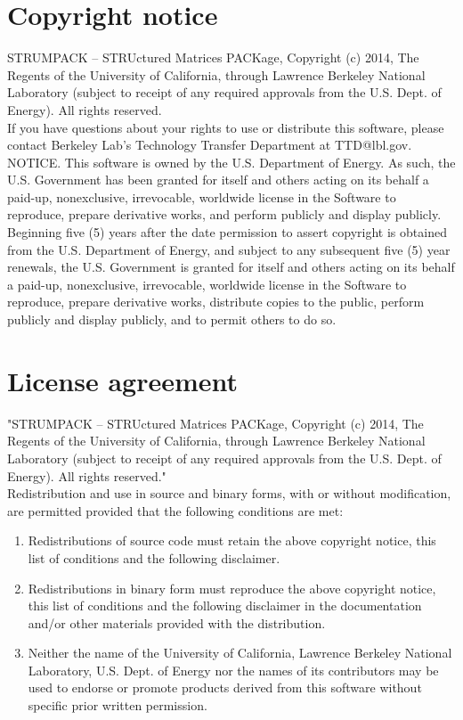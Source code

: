 \documentclass{article}
\begin{document}
\section{Copyright notice}
STRUMPACK -- STRUctured Matrices PACKage, Copyright (c) 2014, The
Regents of the University of California, through Lawrence Berkeley
National Laboratory (subject to receipt of any required approvals from
the U.S. Dept. of Energy). All rights reserved.\\

If you have questions about your rights to use or distribute this
software, please contact Berkeley Lab's Technology Transfer Department
at TTD@lbl.gov.\\

NOTICE. This software is owned by the U.S. Department of Energy. As
such, the U.S. Government has been granted for itself and others
acting on its behalf a paid-up, nonexclusive, irrevocable, worldwide
license in the Software to reproduce, prepare derivative works, and
perform publicly and display publicly. Beginning five (5) years after
the date permission to assert copyright is obtained from the
U.S. Department of Energy, and subject to any subsequent five (5) year
renewals, the U.S. Government is granted for itself and others acting
on its behalf a paid-up, nonexclusive, irrevocable, worldwide license
in the Software to reproduce, prepare derivative works, distribute
copies to the public, perform publicly and display publicly, and to
permit others to do so.

\section{License agreement}
"STRUMPACK -- STRUctured Matrices PACKage, Copyright (c) 2014, The
Regents of the University of California, through Lawrence Berkeley
National Laboratory (subject to receipt of any required approvals
from the U.S. Dept. of Energy).  All rights reserved."\\

Redistribution and use in source and binary forms, with or without
modification, are permitted provided that the following conditions
are met:

\begin{enumerate}
\item Redistributions of source code must retain the above copyright
  notice, this list of conditions and the following disclaimer.

\item Redistributions in binary form must reproduce the above
  copyright notice, this list of conditions and the following
  disclaimer in the documentation and/or other materials provided with
  the distribution.

\item Neither the name of the University of California, Lawrence
  Berkeley National Laboratory, U.S. Dept. of Energy nor the names of
  its contributors may be used to endorse or promote products derived
  from this software without specific prior written permission.
\end{enumerate}
\end{document}
